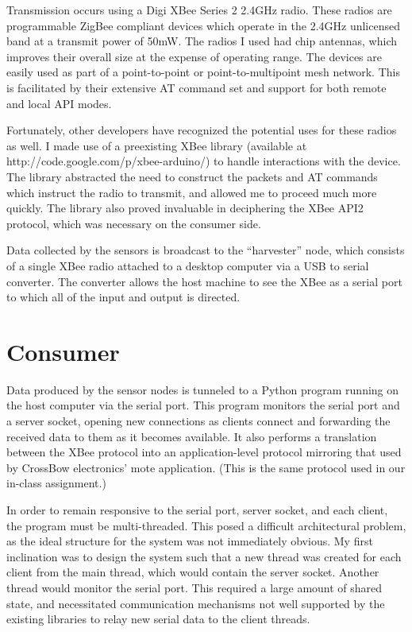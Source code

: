 \documentclass[a4paper,10pt]{article}
\begin{document}
Transmission occurs using a Digi XBee Series 2 2.4GHz radio. These radios are
programmable ZigBee compliant devices which operate in the 2.4GHz unlicensed
band at a transmit power of 50mW. The radios I used had chip antennas, which
improves their overall size at the expense of operating range. The devices are
easily used as part of a point-to-point or point-to-multipoint mesh
network. This is facilitated by their extensive AT command set and support for
both remote and local API modes. 

Fortunately, other developers have recognized the potential uses for these
radios as well. I made use of a preexisting XBee library (available at
http://code.google.com/p/xbee-arduino/) to handle interactions with the
device. The library abstracted the need to construct the packets and AT commands
which instruct the radio to transmit, and allowed me to proceed much more
quickly. The library also proved invaluable in deciphering the XBee API2
protocol, which was necessary on the consumer side. 

Data collected by the sensors is broadcast to the ``harvester'' node, which
consists of a single XBee radio attached to a desktop computer via a USB to
serial converter. The converter allows the host machine to see the XBee as a
serial port to which all of the input and output is directed.

\section{Consumer}
Data produced by the sensor nodes is tunneled to a Python program running on the
host computer via the serial port. This program monitors the serial port and a
server socket, opening new connections as clients connect and forwarding the
received data to them as it becomes available. It also performs a translation
between the XBee protocol into an application-level protocol mirroring that used
by CrossBow electronics' mote application. (This is the same protocol used in our
in-class assignment.)

In order to remain responsive to the serial port, server socket, and each
client, the program must be multi-threaded. This posed a difficult architectural
problem, as the ideal structure for the system was not immediately obvious. My
first inclination was to design the system such that a new thread was created
for each client from the main thread, which would contain the server
socket. Another thread would monitor the serial port. This required a large
amount of shared state, and necessitated communication mechanisms not well
supported by the existing libraries to relay new serial data to the client
threads.
\end{document}
